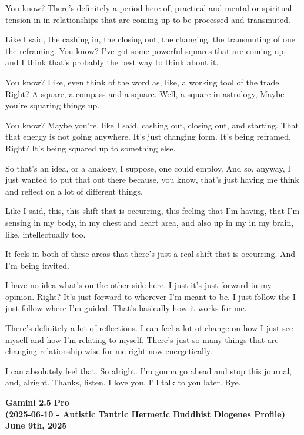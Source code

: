 \documentclass{article}
\begin{document}
You know? There's definitely a period here of, practical and mental or
spiritual tension in in relationships that are coming up to be processed
and transmuted.

Like I said, the cashing in, the closing out, the changing, the
transmuting of one the reframing. You know? I've got some powerful
squares that are coming up, and I think that's probably the best way to
think about it.

You know? Like, even think of the word as, like, a working tool of the
trade. Right? A square, a compass and a square. Well, a square in
astrology, Maybe you're squaring things up.

You know? Maybe you're, like I said, cashing out, closing out, and
starting. That that energy is not going anywhere. It's just changing
form. It's being reframed. Right? It's being squared up to something
else.

So that's an idea, or a analogy, I suppose, one could employ. And so,
anyway, I just wanted to put that out there because, you know, that's
just having me think and reflect on a lot of different things.

Like I said, this, this shift that is occurring, this feeling that I'm
having, that I'm sensing in my body, in my chest and heart area, and
also up in my in my brain, like, intellectually too.

It feels in both of these areas that there's just a real shift that is
occurring. And I'm being invited.

I have no idea what's on the other side here. I just it's just forward
in my opinion. Right? It's just forward to wherever I'm meant to be. I
just follow the I just follow where I'm guided. That's basically how it
works for me.

There's definitely a lot of reflections. I can feel a lot of change on
how I just see myself and how I'm relating to myself. There's just so
many things that are changing relationship wise for me right now
energetically.

I can absolutely feel that. So alright. I'm gonna go ahead and stop this
journal, and, alright. Thanks, listen. I love you. I'll talk to you
later. Bye.

\begin{center}
\textbf{Gamini 2.5 Pro} \\
\textbf{(2025-06-10 - Autistic Tantric Hermetic Buddhist Diogenes Profile)} \\
\textbf{June 9th, 2025}
\end{center}
\end{document}

